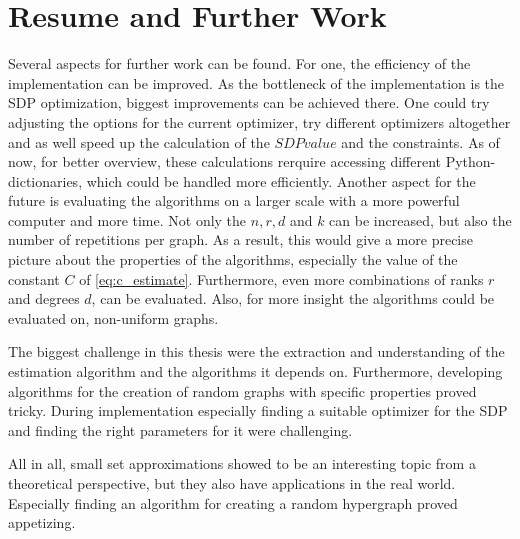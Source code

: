 \chapter{Resume and Further Work}\label{chapter:resmue_further_work}

Several aspects for further work can be found. 
For one, the efficiency of the implementation can be improved. As the bottleneck of the implementation is the SDP optimization, biggest improvements can be achieved there. One could try adjusting the options for the current optimizer, try different optimizers altogether and as well speed up the calculation of the $SDPvalue$ and the constraints. As of now, for better overview, these calculations rerquire accessing different Python-dictionaries, which could be handled more efficiently.
Another aspect for the future is evaluating the algorithms on a larger scale with a more powerful computer and more time. Not only the $n, r, d$ and $k$ can be increased, but also the number of repetitions per graph. As a result, this would give a more precise picture about the properties of the algorithms, especially the value of the constant $C$ of \cref{eq:c_estimate}. Furthermore, even more combinations of ranks $r$ and degrees $d$, can be evaluated. Also, for more insight the algorithms could be evaluated on, non-uniform graphs. 

The biggest challenge in this thesis were the extraction and understanding of the estimation algorithm and the algorithms it depends on. Furthermore, developing algorithms for the creation of random graphs with specific properties proved tricky. During implementation especially finding a suitable optimizer for the SDP and finding the right parameters for it were challenging.

All in all, small set approximations showed to be an interesting topic from a theoretical perspective, but they also have applications in the real world. Especially finding an algorithm for creating a random hypergraph proved appetizing. 


